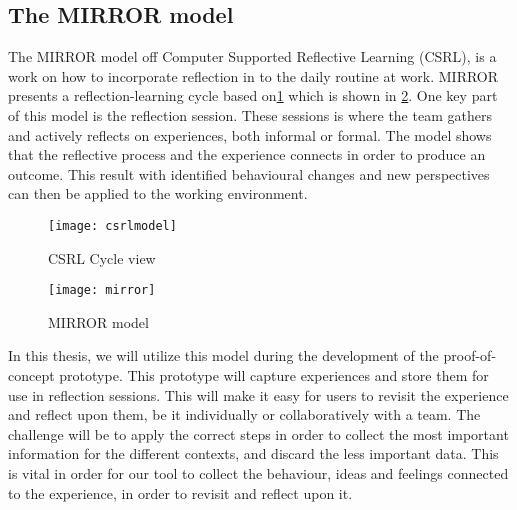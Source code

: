\subsection{The MIRROR model}
\label{mirrorsection}
The MIRROR model off Computer Supported Reflective Learning (CSRL), is a work on how to incorporate reflection in to the daily routine at work.
MIRROR presents a reflection-learning cycle based on\ref{csrlmodel} which is shown in \ref{mirrormodel}. One key part of this model is the reflection session. These sessions is where the team gathers and actively reflects on experiences, both informal or formal. The model shows that the reflective process and the experience connects in order to produce an outcome. This result with identified behavioural changes and new perspectives can then be applied to the working environment. 
\begin{figure}[!htpb]
\label{csrlmodel}
\centering
	\texttt{[image: csrlmodel]}
\caption{CSRL Cycle view}
\end{figure}

\begin{figure}[!htpb]
\centering
	\texttt{[image: mirror]}
\caption{MIRROR model}
\label{mirrormodel}
\end{figure}


In this thesis, we will utilize this model during the development of the proof-of-concept prototype. This prototype will capture experiences and store them for use in reflection sessions. This will make it easy for users to revisit the experience and reflect upon them, be it individually or collaboratively with a team. The challenge will be to apply the correct steps in order to collect the most important information for the different contexts, and discard the less important data. This is vital in order for our tool to collect the behaviour, ideas and feelings connected to the experience, in order to revisit and reflect upon it. 
\clearpage




